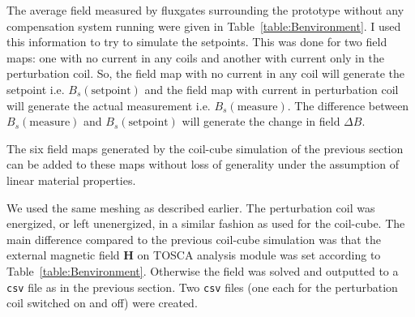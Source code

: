 The average field measured by fluxgates surrounding the prototype
without any compensation system running were given in
Table~\ref{table:Benvironment}.  I used this information to try to
simulate the setpoints.  This was done for two field maps: one with no
current in any coils and another with current only in the perturbation
coil.  So, the field map with no current in any coil will generate the
setpoint i.e. $B_s(\text{setpoint})$ and the field map with current in
perturbation coil will generate the actual measurement
i.e. $B_s(\text{measure})$. The difference between
$B_s(\text{measure})$ and $B_s(\text{setpoint})$ will generate the
change in field $\Delta B$.

The six field maps generated by the coil-cube simulation of the
previous section can be added to these maps without loss of generality
under the assumption of linear material properties.

We used the same meshing as described earlier.  The perturbation coil
was energized, or left unenergized, in a similar fashion as used for
the coil-cube.  
The main difference compared to the previous coil-cube simulation was
that the external magnetic field $\bm{H}$ on TOSCA analysis module was
set according to Table~\ref{table:Benvironment}.
Otherwise the
field was solved and outputted to a {\tt csv} file as in the previous
section.  Two {\tt csv} files (one each for the perturbation coil
switched on and off) were created.

